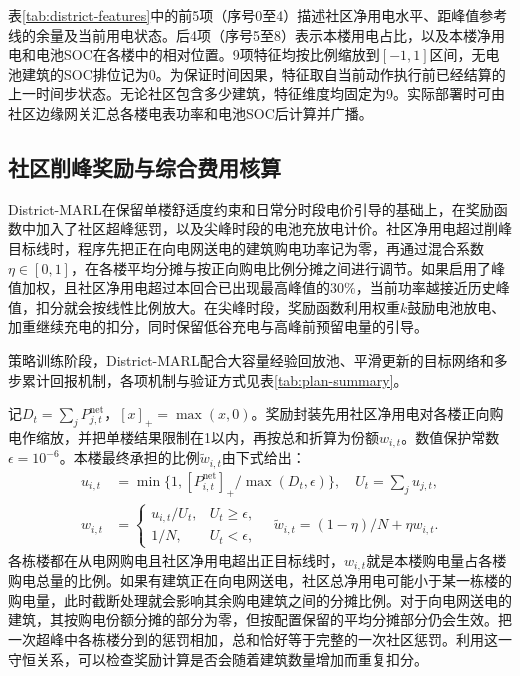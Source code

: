 表\ref{tab:district-features}中的前5项（序号0至4）描述社区净用电水平、距峰值参考线的余量及当前用电状态。后4项（序号5至8）表示本楼用电占比，以及本楼净用电和电池SOC在各楼中的相对位置。9项特征均按比例缩放到$[-1,1]$区间，无电池建筑的SOC排位记为$0$。为保证时间因果，特征取自当前动作执行前已经结算的上一时间步状态。无论社区包含多少建筑，特征维度均固定为9。实际部署时可由社区边缘网关汇总各楼电表功率和电池SOC后计算并广播。

\subsection{社区削峰奖励与综合费用核算}
District-MARL在保留单楼舒适度约束和日常分时段电价引导的基础上，在奖励函数中加入了社区超峰惩罚，以及尖峰时段的电池充放电计价。社区净用电超过削峰目标线时，程序先把正在向电网送电的建筑购电功率记为零，再通过混合系数$\eta\in[0,1]$，在各楼平均分摊与按正向购电比例分摊之间进行调节。如果启用了峰值加权，且社区净用电超过本回合已出现最高峰值的$30\%$，当前功率越接近历史峰值，扣分就会按线性比例放大。在尖峰时段，奖励函数利用权重$k$鼓励电池放电、加重继续充电的扣分，同时保留低谷充电与高峰前预留电量的引导。

策略训练阶段，District-MARL配合大容量经验回放池、平滑更新的目标网络和多步累计回报机制，各项机制与验证方式见表\ref{tab:plan-summary}。

记$D_t=\sum_jP_{j,t}^{\mathrm{net}}$，$[x]_+=\max(x,0)$。奖励封装先用社区净用电对各楼正向购电作缩放，并把单楼结果限制在1以内，再按总和折算为份额$w_{i,t}$。数值保护常数$\epsilon=10^{-6}$。本楼最终承担的比例$\widetilde w_{i,t}$由下式给出：
\begin{equation}
    \label{eq:district-weights}
    \begin{aligned}
        u_{i,t} & =\min\{1,[P_{i,t}^{\mathrm{net}}]_+/\max(D_t,\epsilon)\},\quad U_t=\sum_j u_{j,t}, \\
        w_{i,t} & =\begin{cases}u_{i,t}/U_t,&U_t\geq\epsilon,\\1/N,&U_t<\epsilon,\end{cases}
        \quad \widetilde w_{i,t}=(1-\eta)/N+\eta w_{i,t}.
    \end{aligned}
\end{equation}
各栋楼都在从电网购电且社区净用电超出正目标线时，$w_{i,t}$就是本楼购电量占各楼购电总量的比例。如果有建筑正在向电网送电，社区总净用电可能小于某一栋楼的购电量，此时截断处理就会影响其余购电建筑之间的分摊比例。对于向电网送电的建筑，其按购电份额分摊的部分为零，但按配置保留的平均分摊部分仍会生效。把一次超峰中各栋楼分到的惩罚相加，总和恰好等于完整的一次社区惩罚。利用这一守恒关系，可以检查奖励计算是否会随着建筑数量增加而重复扣分。


